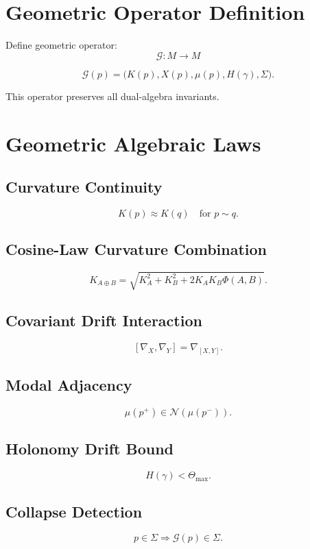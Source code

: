 \documentclass[11pt]{article}
\begin{document}
\section{Geometric Operator Definition}

Define geometric operator:
\[
\mathcal{G} : M \to M
\]

\[
\mathcal{G}(p) =
  \big( K(p), X(p), \mu(p), H(\gamma), \Sigma \big).
\]

This operator preserves all dual-algebra invariants.

\section{Geometric Algebraic Laws}

\subsection{Curvature Continuity}
\[
K(p) \approx K(q) \quad \text{for } p \sim q.
\]

\subsection{Cosine-Law Curvature Combination}
\[
K_{A\oplus B}
  = \sqrt{K_A^2 + K_B^2 + 2 K_A K_B \Phi(A,B)}.
\]

\subsection{Covariant Drift Interaction}
\[
[\nabla_X,\nabla_Y] = \nabla_{[X,Y]}.
\]

\subsection{Modal Adjacency}
\[
\mu(p^+) \in \mathcal{N}(\mu(p^-)).
\]

\subsection{Holonomy Drift Bound}
\[
H(\gamma) < \Theta_{\max}.
\]

\subsection{Collapse Detection}
\[
p \in \Sigma \Rightarrow \mathcal{G}(p) \in \Sigma.
\]
\end{document}
